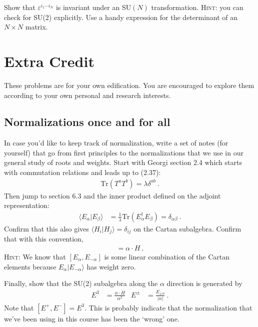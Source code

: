 \documentclass[12pt]{article}
\numberwithin{equation}{subsection}    %
\begin{document}
Show that $\varepsilon^{i_1\cdots i_N}$ is invariant under an SU$(N)$ transformation. \textsc{Hint}: you can check for SU(2) explicitly. Use a handy expression for the determinant of an $N\times N$ matrix.


\section*{Extra Credit}

These problems are for your own edification. You are encouraged to explore them according to your own personal and research interests.
%
%

\subsection*{Normalizations once and for all}

In case you'd like to keep track of normalization, write a set of notes (for yourself) that go from first principles to the normalizations that we use in our general study of roots and weights.  Start with Georgi section 2.4 which starts with commutation relations and leads up to (2.37):
\begin{align}
  \text{Tr}(T^aT^b) = \lambda\delta^{ab} \ .
\end{align}
Then jump to section 6.3 and the inner product defined on the adjoint representation:
\begin{align}
  \langle E_\alpha | E_\beta \rangle
  &= \frac{1}{\lambda}\text{Tr}\left(E^\dag_\alpha E_\beta \right) = \delta_{\alpha\beta} \ .
\end{align}
Confirm that this also gives $\langle H_i | H_j \rangle = \delta_{ij}$ on the Cartan subalgebra. Confirm that with this convention,
\begin{align}
  [E_\alpha, E_{-\alpha}] = \alpha \cdot H \ .
\end{align}
\textsc{Hint}: We know that $[E_\alpha, E_{-\alpha}]$ is some linear combination of the Cartan elements because $E_\alpha|E_{-\alpha}\rangle$ has weight zero.

Finally, show that the SU(2) subalgebra along the $\alpha$ direction is generated by
\begin{align}
  E^3 &= \frac{\alpha\cdot H}{\alpha^2}
  &
  E^\pm &= \frac{E_{\pm \alpha}}{|\alpha|} \ .
\end{align}
Note that $[E^+, E^-] = E^3$. This is probably indicate that the normalization that we've been using in this course has been the `wrong' one.
\end{document}
